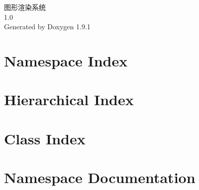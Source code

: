 \let\mypdfximage\pdfximage\def\pdfximage{\immediate\mypdfximage}\documentclass[twoside]{book}
\newcommand{\+}{\discretionary{\mbox{\scriptsize$\hookleftarrow$}}{}{}}
\newcommand{\clearemptydoublepage}{%
  \newpage{\pagestyle{empty}\cleardoublepage}%
}
\begin{document}
\raggedbottom

\hypersetup{pageanchor=false,
             bookmarksnumbered=true,
             pdfencoding=unicode
            }
\begin{titlepage}
\vspace*{7cm}
\begin{center}%
{\Large 图形渲染系统 \\[1ex]\large 1.\+0 }\\
\vspace*{1cm}
{\large Generated by Doxygen 1.9.1}\\
\end{center}
\end{titlepage}
\clearemptydoublepage
{}
\tableofcontents
\clearemptydoublepage
{}
\hypersetup{pageanchor=true}

\chapter{Namespace Index}

\chapter{Hierarchical Index}

\chapter{Class Index}

\chapter{Namespace Documentation}







\end{document}
